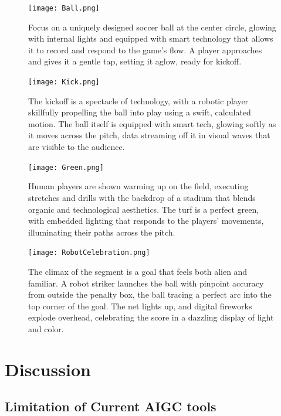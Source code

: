 \documentclass[11pt,a4paper,oneside]{report}
\begin{document}
\begin{figure}[htbp]
  \centering
  \texttt{[image: Ball.png]}
  \caption{Focus on a uniquely designed soccer ball at the center circle, glowing with internal lights and equipped with smart technology that allows it to record and respond to the game's flow. A player approaches and gives it a gentle tap, setting it aglow, ready for kickoff.}
\end{figure}
\begin{figure}[htbp]
  \centering
  \texttt{[image: Kick.png]}
  \caption{The kickoff is a spectacle of technology, with a robotic player skillfully propelling the ball into play using a swift, calculated motion. The ball itself is equipped with smart tech, glowing softly as it moves across the pitch, data streaming off it in visual waves that are visible to the audience.}
\end{figure}

\begin{figure}[htbp]
  \centering
  \texttt{[image: Green.png]}
  \caption{Human players are shown warming up on the field, executing stretches and drills with the backdrop of a stadium that blends organic and technological aesthetics. The turf is a perfect green, with embedded lighting that responds to the players' movements, illuminating their paths across the pitch.}
\end{figure}

\begin{figure}[htbp]
  \centering
  \texttt{[image: RobotCelebration.png]}
  \caption{The climax of the segment is a goal that feels both alien and familiar. A robot striker launches the ball with pinpoint accuracy from outside the penalty box, the ball tracing a perfect arc into the top corner of the goal. The net lights up, and digital fireworks explode overhead, celebrating the score in a dazzling display of light and color.}
\end{figure}



\chapter{Discussion}
\label{discussion}

\section{Limitation of Current AIGC tools}
\end{document}

